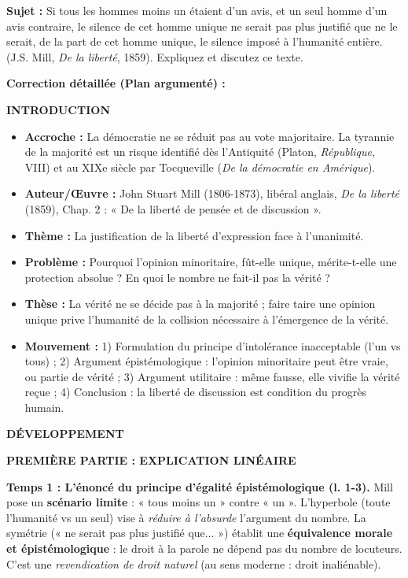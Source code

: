 \documentclass[11pt]{article}
\begin{document}
\begin{exoresolu}
\textbf{Sujet :} \guillemotleft Si tous les hommes moins un étaient d'un avis, et un seul homme d'un avis contraire, le silence de cet homme unique ne serait pas plus justifié que ne le serait, de la part de cet homme unique, le silence imposé à l'humanité entière. \guillemotright (J.S. Mill, \emph{De la liberté}, 1859). Expliquez et discutez ce texte.

\textbf{Correction détaillée (Plan argumenté) :}

\textbf{INTRODUCTION}
\begin{itemize}
    \item \textbf{Accroche :} La démocratie ne se réduit pas au vote majoritaire. La tyrannie de la majorité est un risque identifié dès l'Antiquité (Platon, \emph{République}, VIII) et au XIXe siècle par Tocqueville (\emph{De la démocratie en Amérique}).
    \item \textbf{Auteur/Œuvre :} John Stuart Mill (1806-1873), libéral anglais, \emph{De la liberté} (1859), Chap. 2 : « De la liberté de pensée et de discussion ».
    \item \textbf{Thème :} La justification de la liberté d'expression face à l'unanimité.
    \item \textbf{Problème :} Pourquoi l'opinion minoritaire, fût-elle unique, mérite-t-elle une protection absolue ? En quoi le nombre ne fait-il pas la vérité ?
    \item \textbf{Thèse :} La vérité ne se décide pas à la majorité ; faire taire une opinion unique prive l'humanité de la collision nécessaire à l'émergence de la vérité.
    \item \textbf{Mouvement :} 1) Formulation du principe d'intolérance inacceptable (l'un vs tous) ; 2) Argument épistémologique : l'opinion minoritaire peut être vraie, ou partie de vérité ; 3) Argument utilitaire : même fausse, elle vivifie la vérité reçue ; 4) Conclusion : la liberté de discussion est condition du progrès humain.
\end{itemize}

\textbf{DÉVELOPPEMENT}

\textbf{PREMIÈRE PARTIE : EXPLICATION LINÉAIRE}

\textbf{Temps 1 : L'énoncé du principe d'égalité épistémologique (l. 1-3).}
Mill pose un \textbf{scénario limite} : « tous moins un » contre « un ». L'hyperbole (toute l'humanité vs un seul) vise à \emph{réduire à l'absurde} l'argument du nombre. La symétrie (« ne serait pas plus justifié que... ») établit une \textbf{équivalence morale et épistémologique} : le droit à la parole ne dépend pas du nombre de locuteurs. C'est une \emph{revendication de droit naturel} (au sens moderne : droit inaliénable).


\end{exoresolu}
\end{document}
